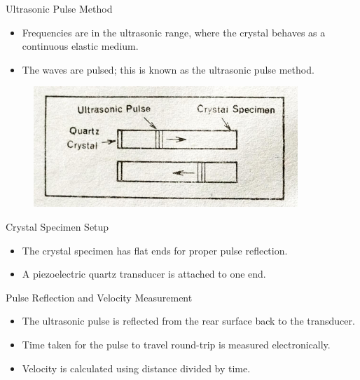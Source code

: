 \documentclass[aspectratio=43]{beamer}
\begin{document}
\begin{frame}{Ultrasonic Pulse Method}
    \begin{itemize}
        \item Frequencies are in the ultrasonic range, where the crystal behaves as a continuous elastic medium.
        \item The waves are pulsed; this is known as the ultrasonic pulse method.
    \end{itemize}
    \begin{figure}[H]
        \centering
        \includegraphics[scale=0.5]{images/3.png}
    \end{figure}
\end{frame}

\begin{frame}{Crystal Specimen Setup}
    \begin{itemize}
        \item The crystal specimen has flat ends for proper pulse reflection.
        \item A piezoelectric quartz transducer is attached to one end.
    \end{itemize}
\end{frame}

\begin{frame}{Pulse Reflection and Velocity Measurement}
    \begin{itemize}
        \item The ultrasonic pulse is reflected from the rear surface back to the transducer.
        \item Time taken for the pulse to travel round-trip is measured electronically.
        \item Velocity is calculated using distance divided by time.
    \end{itemize}
\end{frame}
\end{document}
